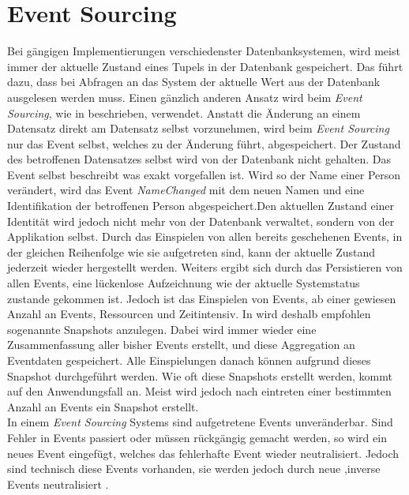 \section{Event Sourcing}
Bei gängigen Implementierungen verschiedenster Datenbanksystemen, wird meist immer der aktuelle Zustand eines Tupels in der Datenbank gespeichert. Das führt dazu, dass bei Abfragen an das System der aktuelle Wert aus der Datenbank ausgelesen werden muss. Einen gänzlich anderen Ansatz wird beim \textit{Event Sourcing}, wie in \cite{vernon2013implementing} beschrieben, verwendet. Anstatt die Änderung an einem Datensatz direkt am Datensatz selbst vorzunehmen, wird beim \textit{Event Sourcing} nur das Event selbst, welches zu der Änderung führt, abgespeichert. Der Zustand des betroffenen Datensatzes selbst wird von der Datenbank nicht gehalten. Das Event selbst beschreibt was exakt vorgefallen ist. Wird so der Name einer Person verändert, wird das Event \textit{NameChanged} mit dem neuen Namen und eine Identifikation der betroffenen Person abgespeichert.Den aktuellen Zustand einer Identität wird jedoch nicht mehr von der Datenbank verwaltet, sondern von der Applikation selbst. Durch das Einspielen von allen bereits geschehenen Events, in der gleichen Reihenfolge wie sie aufgetreten sind, kann der aktuelle Zustand jederzeit wieder hergestellt werden. Weiters ergibt sich durch das Persistieren von allen Events, eine lückenlose Aufzeichnung wie der aktuelle Systemstatus zustande gekommen ist. \cite{vernon2013implementing} 
Jedoch ist das Einspielen von Events, ab einer gewiesen Anzahl an Events, Ressourcen und Zeitintensiv. In \cite{vernon2013implementing} wird deshalb empfohlen sogenannte Snapshots  anzulegen. Dabei wird immer wieder eine Zusammenfassung aller bisher Events erstellt, und diese Aggregation an Eventdaten gespeichert.  Alle Einspielungen danach können aufgrund dieses Snapshot durchgeführt werden. Wie oft diese Snapshots erstellt werden, kommt auf den Anwendungsfall an. Meist wird jedoch nach eintreten einer bestimmten Anzahl an Events ein Snapshot erstellt. \\
In einem  \textit{Event Sourcing} Systems sind aufgetretene Events unveränderbar. Sind Fehler in Events passiert oder müssen rückgängig gemacht werden, so wird ein neues Event eingefügt, welches das fehlerhafte Event wieder neutralisiert. Jedoch sind technisch diese Events vorhanden, sie werden jedoch durch neue ,inverse Events  neutralisiert \citep{vernon2013implementing}. 
